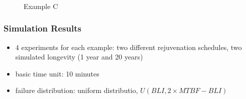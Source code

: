 \begin{figure}[h]
     \begin{center}
\\
        
\\
        
\\
    \end{center}
     \caption{Example C}
\end{figure}


\subsubsection{Simulation Results}

\begin{itemize}
  \item 4 experiments for each example: two different rejuvenation schedules, 
two simulated longevity (1 year and 20 years)
  \item basic time unit: 10 minutes
  \item failure distribution: uniform distributio, $U(BLI, 2\times MTBF-BLI)$
\end{itemize}





